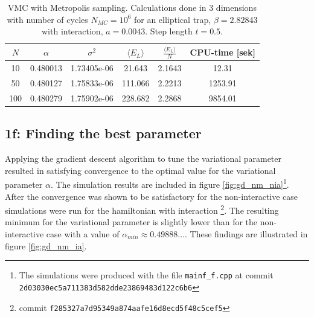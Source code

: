 \begin{table}[]
    \centering
    \begin{tabular}{|c|c|c|c|c|c|}
    \hline
         $N$ & $\alpha$ & $\sigma^2$ & $\langle E_L \rangle$ & $\frac{\langle E_L \rangle}{N}$ & CPU-time [sek] \\
         \hline
         10 & 0.480013 & 1.73405e-06 & 21.643 & 2.1643 & 12.31 \\
         \hline
         50 & 0.480127 & 1.75833e-06 & 111.066 & 2.2213 & 1253.91\\
         \hline
         100 & 0.480279 & 1.75902e-06 & 228.682 & 2.2868 & 9854.01 \\
         \hline
    \end{tabular}
    \caption{VMC with Metropolis sampling. Calculations done in 3 dimensions with number of cycles $N_{MC} = 10^{6}$ for an elliptical trap, $\beta = 2.82843$ with interaction, $a = 0.0043$. Step length $t = 0.5$.}
    \label{tab:Re.int.}
\end{table}


\subsection*{\textbf{1f:} Finding the best parameter}
Applying the gradient descent algorithm to tune the variational parameter resulted in satisfying convergence to the optimal value for the variational parameter $\alpha$. The simulation results are included in figure \ref{fig:gd_nm_nia}\footnote{The simulations were produced with the file \lstinline{mainf_f.cpp} at commit \lstinline{2d03030ec5a711383d582dde23869483d122c6b6}}. After the convergence was shown to be satisfactory for the non-interactive case simulations were run for the hamiltonian with interaction \footnote{commit \lstinline{f285327a7d95349a874aafe16d8ecd5f48c5cef5}}. The resulting minimum for the variational parameter is slightly lower than for the non-interactive case with a value of $\alpha_{min} \approx 0.49888\ldots$. These findings are illustrated in figure \ref{fig:gd_nm_ia}. 


